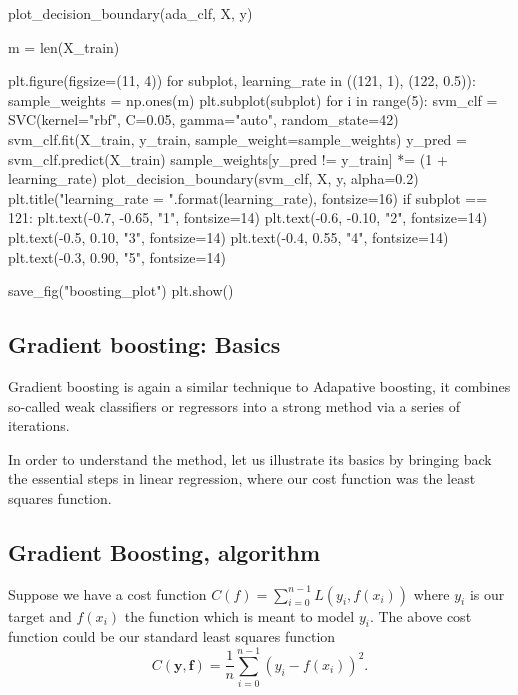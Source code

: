 \documentclass[%
oneside,                 %
final,                   %
10pt]{article}
\begin{document}
plot_decision_boundary(ada_clf, X, y)

m = len(X_train)

plt.figure(figsize=(11, 4))
for subplot, learning_rate in ((121, 1), (122, 0.5)):
    sample_weights = np.ones(m)
    plt.subplot(subplot)
    for i in range(5):
        svm_clf = SVC(kernel="rbf", C=0.05, gamma="auto", random_state=42)
        svm_clf.fit(X_train, y_train, sample_weight=sample_weights)
        y_pred = svm_clf.predict(X_train)
        sample_weights[y_pred != y_train] *= (1 + learning_rate)
        plot_decision_boundary(svm_clf, X, y, alpha=0.2)
        plt.title("learning_rate = {}".format(learning_rate), fontsize=16)
    if subplot == 121:
        plt.text(-0.7, -0.65, "1", fontsize=14)
        plt.text(-0.6, -0.10, "2", fontsize=14)
        plt.text(-0.5,  0.10, "3", fontsize=14)
        plt.text(-0.4,  0.55, "4", fontsize=14)
        plt.text(-0.3,  0.90, "5", fontsize=14)

save_fig("boosting_plot")
plt.show()
\epycod


\subsection{Gradient boosting: Basics}

Gradient boosting is again a similar technique to Adapative boosting,
it combines so-called weak classifiers or regressors into a strong
method via a series of iterations.

In order to understand the method, let us illustrate its basics by
bringing back the essential steps in linear regression, where our cost
function was the least squares function.

\subsection{Gradient Boosting, algorithm}

Suppose we have a cost function $C(f)=\sum_{i=0}^{n-1}L(y_i, f(x_i))$ where $y_i$ is our target and $f(x_i)$ the function which is meant to model $y_i$. The above cost function could be our standard least squares  function
\[
C(\bm{y},\bm{f})=\frac{1}{n}\sum_{i=0}^{n-1}(y_i-f(x_i))^2.
\]
\end{document}
